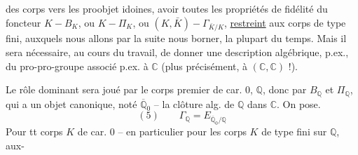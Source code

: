 des corps vers les proobjet idoines,  avoir toutes les propriétés de fidélité du foncteur $K-B_K$, ou $K-\Pi_K$, ou $(K,\bar K)-\Gamma_{\bar K/K}$, \uline{restreint} aux corps  de type fini, auxquels nous allons par la suite nous borner, la plupart du temps. Mais il sera nécessaire, au cours du travail, de donner une description  algébrique, p.ex., du pro-pro-groupe  associé p.ex. à $\mathbb C$ (plus précisément, à $(\mathbb C,\mathbb C)$ !).

Le rôle dominant sera joué par le corps premier de car. $0$, $\mathbb Q$, donc par $B_{\mathbb Q}$ et $\Pi_{\mathbb Q}$, qui a un objet canonique, noté $\overline{\mathbb Q}_0$ -- la clôture alg. de $\mathbb Q$ dans $\mathbb C$. On pose.
\[
(5)\qquad \Gamma_{\mathbb Q}=E_{\overline{\mathbb Q}_0/\mathbb Q}
\]
Pour tt corps $K$ de car. $0$ -- en particulier pour les corps $K$ de type fini sur $\mathbb Q$, aux-
